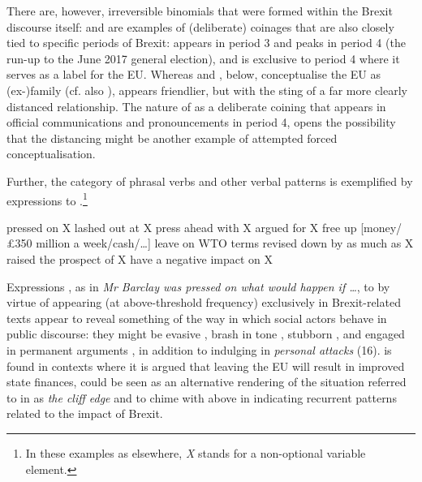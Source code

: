 \documentclass[output=paper]{langscibook}
\begin{document}
There are, however, irreversible binomials that were formed within the Brexit discourse itself:  and  are examples of (deliberate) coinages that are also closely tied to specific periods of Brexit:  appears in period 3 and peaks in period 4 (the run-up to the June 2017 general election), and  is exclusive to period 4 where it serves as a label for the EU. Whereas  and , below, conceptualise the EU as (ex-)family (cf. also \citealt{Islentyeva2019}),  appears friendlier, but with the sting of a far more clearly distanced relationship. The nature of  as a deliberate coining that appears in official communications and pronouncements in period 4, opens the possibility that the distancing might be another example of attempted forced conceptualisation.

Further, the category of phrasal verbs and other verbal patterns is exemplified by expressions  to .\footnote{In these examples as elsewhere, \textit{X} stands for a non-optional variable element.}

\ea pressed on X\label{ex:buerki:23}
\ex lashed out at X\label{ex:buerki:24}
\ex press ahead with X\label{ex:buerki:25}
\ex argued for X\label{ex:buerki:26}
\ex free up [money/£350 million a week/cash/…]\label{ex:buerki:27}
\ex leave on WTO terms\label{ex:buerki:28}
\ex revised down\label{ex:buerki:29}
\ex{} by as much as X\label{ex:buerki:30}
\ex raised the prospect of X\label{ex:buerki:31}
\ex have a negative impact on X\label{ex:buerki:32}
\z

Expressions , as in \textit{Mr Barclay was pressed on what would happen if …}, to  by virtue of appearing (at above-threshold frequency) exclusively in Brexit-related texts appear to reveal something of the way in which social actors behave in public discourse: they might be evasive , brash in tone , stubborn , and engaged in permanent arguments , in addition to indulging in \textit{personal attacks} (16).  is found in contexts where it is argued that leaving the EU will result in improved state finances,  could be seen as an alternative rendering of the situation referred to in  as \textit{the cliff edge} and  to  chime with  above in indicating recurrent patterns related to the impact of Brexit. 
\end{document}
